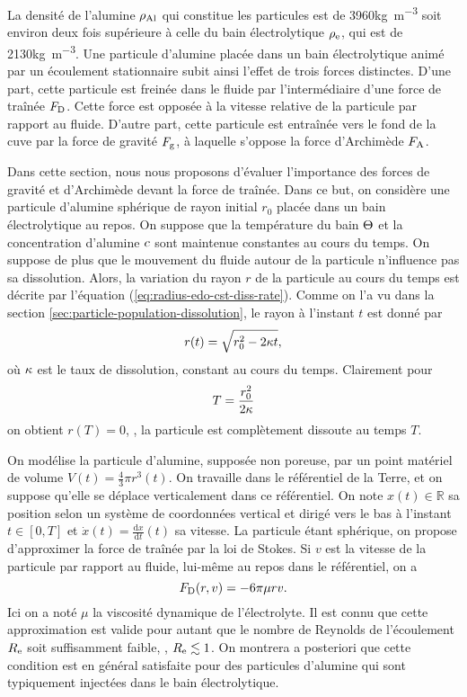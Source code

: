 La densité de l'alumine $\rho_\mathrm{Al}$ qui constitue les particules
est de \num{3960}\si{\kilo\gram\per\cubic\meter} soit environ deux
fois supérieure à celle du bain électrolytique $\rho_\mathrm{e}$,
qui est de \num{2130}\si{\kilo\gram\per\cubic\meter}. Une particule
d'alumine placée dans un bain électrolytique animé par un écoulement
stationnaire subit ainsi l'effet de trois forces
distinctes. D'une part, cette particule est freinée dans le fluide
par l'intermédiaire d'une force de traînée $F_{\mathrm D}$. Cette force
est opposée à la vitesse relative de la particule par rapport au
fluide. D'autre part, cette particule est entraînée vers le fond de
la cuve par la force de gravité $F_{\mathrm g}$, à laquelle s'oppose
la force d'Archimède $F_{\mathrm A}$.

Dans cette section, nous nous proposons d'évaluer l'importance des
forces de gravité et d'Archimède devant la force de traînée. Dans ce
but, on considère une particule d'alumine sphérique de rayon initial
$r_0$ placée dans un bain électrolytique au repos. On suppose que la
température du bain $\Theta$ et la concentration d'alumine
$c$ sont maintenue constantes au cours du temps. On
suppose de plus que le mouvement du fluide autour de la particule
n'influence pas sa dissolution. Alors, la variation du rayon $r$ de la
particule au cours du temps est décrite par l'équation
(\ref{eq:radius-edo-cst-diss-rate}). Comme on l'a vu dans la section
\ref{sec:particle-population-dissolution}, le rayon à l'instant $t$
est donné par
\begin{equation}\label{eq:radius}
  r(t) = \sqrt{r_0^2 - 2\kappa t},
\end{equation}
où $\kappa$ est le taux de dissolution, constant au cours du
temps. Clairement pour
\begin{equation}\label{eq:final-time}
  T = \frac{r_0^2}{2\kappa}
\end{equation}
on obtient $r(T) = 0$, \ie, la particule est complètement dissoute
au temps $T$.

On modélise la particule d'alumine, supposée non poreuse, par un point
matériel de volume $V(t) = \frac{4}{3}\pi r^3(t)$. On travaille dans
le référentiel de la Terre, et on suppose qu'elle se déplace
verticalement dans ce référentiel. On note $x(t)\in \mathbb R$ sa
position selon un système de coordonnées vertical et dirigé vers le
bas à l'instant $t\in [0,T]$ et $\dot x(t) = \frac{\mathrm dx}{\mathrm
  dt}(t)$ sa vitesse. La particule étant sphérique, on propose
d'approximer la force de traînée par la loi de Stokes. Si $v$ est la
vitesse de la particule par rapport au fluide, lui-même au repos dans
le référentiel, on a
\begin{equation*}
F_{\mathrm D}(r, v) = -6\pi\mu r v.
\end{equation*}
Ici on a noté $\mu$ la viscosité dynamique de l'électrolyte. Il est
connu que cette approximation est valide pour autant que le nombre de
Reynolds de l'écoulement $R_{\mathrm e}$ soit suffisamment faible, \ie,
$R_{\mathrm e} \lesssim 1$. On montrera a posteriori que cette condition
est en général satisfaite pour des particules d'alumine qui sont
typiquement injectées dans le bain électrolytique.

